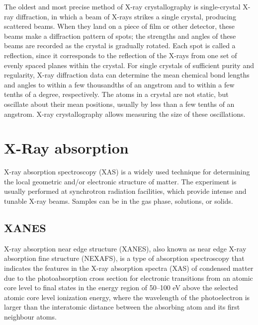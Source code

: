 \documentclass[book.tex]{subfiles}
\begin{document}
The oldest and most precise method of X-ray crystallography is single-crystal X-ray diffraction, in which a beam of X-rays strikes a single crystal, producing scattered beams. When they land on a piece of film or other detector, these beams make a diffraction pattern of spots; the strengths and angles of these beams are recorded as the crystal is gradually rotated. Each spot is called a reflection, since it corresponds to the reflection of the X-rays from one set of evenly spaced planes within the crystal. For single crystals of sufficient purity and regularity, X-ray diffraction data can determine the mean chemical bond lengths and angles to within a few thousandths of an angstrom and to within a few tenths of a degree, respectively. The atoms in a crystal are not static, but oscillate about their mean positions, usually by less than a few tenths of an angstrom. X-ray crystallography allows measuring the size of these oscillations.
\section{X-Ray absorption}
X-ray absorption spectroscopy (XAS) is a widely used technique for determining the local geometric and/or electronic structure of matter. The experiment is usually performed at synchrotron radiation facilities, which provide intense and tunable X-ray beams. Samples can be in the gas phase, solutions, or solids.
\subsection{XANES}
	
X-ray absorption near edge structure (XANES), also known as near edge X-ray absorption fine structure (NEXAFS), is a type of absorption spectroscopy that indicates the features in the X-ray absorption spectra (XAS) of condensed matter due to the photoabsorption cross section for electronic transitions from an atomic core level to final states in the energy region of 50–100 eV above the selected atomic core level ionization energy, where the wavelength of the photoelectron is larger than the interatomic distance between the absorbing atom and its first neighbour atoms.

\end{document}
